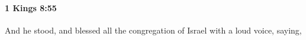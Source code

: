 
		\paragraph{1 Kings 8:55} %
			\label{1KINGS-8-55}

			And he stood, and blessed all the congregation of Israel with a loud voice, saying,



